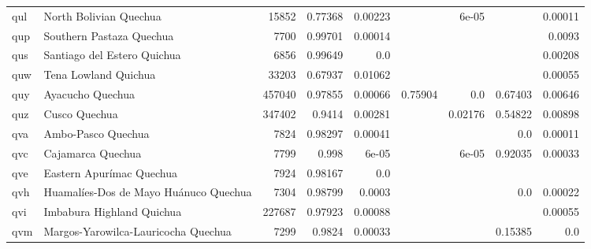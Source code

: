 \documentclass[11pt]{article}
\begin{document}
\begin{table*}[h]
{\begin{tabular}{llrrrrrrr}
qul         & North Bolivian Quechua         & 15852         & 0.77368         & 0.00223         &          & 6e-05         &          & 0.00011         \\

qup         & Southern Pastaza Quechua         & 7700         & 0.99701         & 0.00014         &          &          &          & 0.0093         \\

qus         & Santiago del Estero Quichua         & 6856         & 0.99649         & 0.0         &          &          &          & 0.00208         \\

quw         & Tena Lowland Quichua         & 33203         & 0.67937         & 0.01062         &          &          &          & 0.00055         \\

quy         & Ayacucho Quechua         & 457040         & 0.97855         & 0.00066         & 0.75904         & 0.0         & 0.67403         & 0.00646         \\

quz         & Cusco Quechua         & 347402         & 0.9414         & 0.00281         &          & 0.02176         & 0.54822         & 0.00898         \\

qva         & Ambo-Pasco Quechua         & 7824         & 0.98297         & 0.00041         &          &          & 0.0         & 0.00011         \\

qvc         & Cajamarca Quechua         & 7799         & 0.998         & 6e-05         &          & 6e-05         & 0.92035         & 0.00033         \\

qve         & Eastern Apurímac Quechua         & 7924         & 0.98167         & 0.0         &          &          &          &          \\

qvh         & Huamalíes-Dos de Mayo Huánuco Quechua         & 7304         & 0.98799         & 0.0003         &          &          & 0.0         & 0.00022         \\

qvi         & Imbabura Highland Quichua         & 227687         & 0.97923         & 0.00088         &          &          &          & 0.00055         \\

qvm         & Margos-Yarowilca-Lauricocha Quechua         & 7299         & 0.9824         & 0.00033         &          &          & 0.15385         & 0.0         \\


\end{tabular}}
\end{table*}
\end{document}
